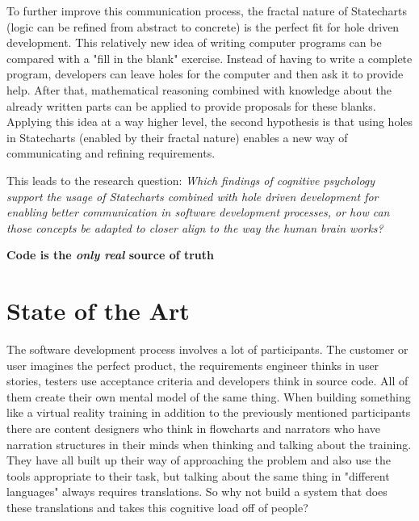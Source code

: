 To further improve this communication process, the fractal nature of Statecharts (logic can be refined from abstract to concrete) is the perfect fit for hole driven development. This relatively new idea of writing computer programs can be compared with a "fill in the blank" exercise. Instead of having to write a complete program, developers can leave holes for the computer and then ask it to provide help. After that, mathematical reasoning combined with knowledge about the already written parts can be applied to provide proposals for these blanks. Applying this idea at a way higher level, the second hypothesis is that using holes in Statecharts (enabled by their fractal nature) enables a new way of communicating and refining requirements.

This leads to the research question: \emph{Which findings of cognitive psychology support the usage of Statecharts combined with hole driven development for enabling better communication in software development processes, or how can those concepts be adapted to closer align to the way the human brain works?}

\textbf{Code is the \textit{only real} source of truth}

\section{State of the Art}
\label{sec:state-of-the-art}
The software development process involves a lot of participants. The customer or user imagines the perfect product, the requirements engineer thinks in user stories, testers use acceptance criteria and developers think in source code. All of them create their own mental model of the same thing. When building something like a virtual reality training in addition to the previously mentioned participants there are content designers who think in flowcharts and narrators who have narration structures in their minds when thinking and talking about the training.
They have all built up their way of approaching the problem and also use the tools appropriate to their task, but talking about the same thing in "different languages" always requires translations. So why not build a system that does these translations and takes this cognitive load off of people?